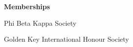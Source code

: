 \begin{singlespace}

\centerline{\textbf{\Large Memberships}}
\vspace{8pt}
\centerline{Phi Beta Kappa Society}
\centerline{Golden Key International Honour Society}
\end{singlespace}



%

